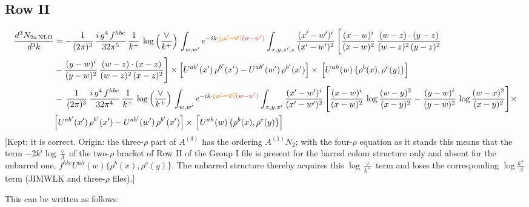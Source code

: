 \documentclass[9pt]{article}
\numberwithin{equation}{section}
\begin{document}
\subsection{Row II}
\begin{align}
\frac{d^{3}N_{2a\,\rm NLO}}{d^{3}k} & =  -\frac{1}{(2\pi)^{3}}\,\frac{i\,g^{4}\,f^{hbc}}{32\pi^{5}}\,\frac{1}{k^{+}}\,\log{\left(\frac{\vee}{k^{+}}\right)}\,
\int_{w,w'} e^{-ik\cdot{\color{orange}\cancel{(w'-w)}}{\color{red}(w-w')}}\int_{x,y,x',z}\frac{(x'-w')^{i}}{(x'-w')^{2}}\,\Bigg[\frac{(x-w)^{i}}{(x-w)^{2}}\, \frac{(w-z)\cdot (y-z)}{(w-z)^{2}\,(y-z)^{2}}\notag \\ & - \frac{(y-w)^{i}}{(y-w)^{2}}\, \frac{(w-z)\cdot (x-z)}{(w-z)^{2}\,(x-z)^{2}}\Bigg]\times\Big[U^{ab'}(x')\,\rho^{b'}(x')-U^{ab'}(w')\,\rho^{b'}(x')\Big]\times\, \Big[U^{ah}(w)\,\{\rho^{b}(x),\rho^{c}(y)\}\Big] \notag \\
& -\,\frac{1}{(2\pi)^{3}}\,\frac{i\,g^{4}\,f^{hbc}}{32\pi^{4}}\,\frac{1}{k^{+}}\,\log{\left(\frac{\vee}{k^{+}}\right)}\,
\int_{w,w'} e^{-ik\cdot{\color{orange}\cancel{(w'-w)}}{\color{red}(w-w')}}\int_{x,y,x'}\frac{(x'-w')^{i}}{(x'-w')^{2}}\,\Bigg[\frac{(x-w)^{i}}{(x-w)^{2}}\,\log\frac{(w-y)^{2}}{(x-y)^{2}}-\frac{(y-w)^{i}}{(y-w)^{2}}\,\log\frac{(w-x)^{2}}{(x-y)^{2}}\Bigg]\times\notag \\ & \Big[U^{ab'}(x')\,\rho^{b'}(x')-U^{ab'}(w')\,\rho^{b'}(x')\Big]\times\, \Big[U^{ah}(w)\,\{\rho^{b}(x),\rho^{c}(y)\}\Big]
\end{align} {\color{red}[Kept; it is correct. Origin: the three-$\rho$ part of $A^{(3)}$ has the ordering $A^{(1)}N_{2}$; with the four-$\rho$ equation as it stands this means that the term $-2k^{i}\log\frac{\vee}{\Lambda}$ of the two-$\rho$ bracket of Row II of the Group I file is present for the barred colour structure only and absent for the unbarred one, $f^{hbc}U^{ah}(w)\{\rho^{b}(x),\rho^{c}(y)\}$. The unbarred structure thereby acquires this $\log\frac{\vee}{k^{+}}$ term and loses the corresponding $\log\frac{k^{+}}{\Lambda}$ term (JIMWLK and three-$\rho$ files).]}\par\noindent
This can be written as follows: 
\end{document}
